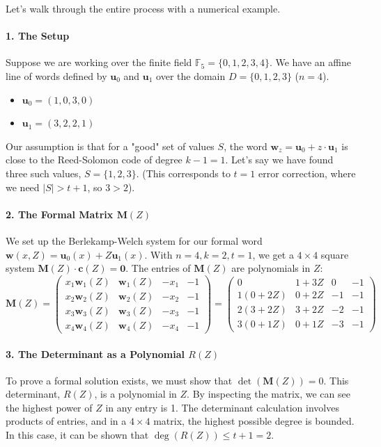 \documentclass{article}
\begin{document}
\begin{tcolorbox}[breakable, title={Full Example: Proving a Formal Solution Exists}]
Let's walk through the entire process with a numerical example.

\paragraph{1. The Setup}
Suppose we are working over the finite field $\mathbb{F}_5 = \{0,1,2,3,4\}$. We have an affine line of words defined by $\mathbf{u}_0$ and $\mathbf{u}_1$ over the domain $D=\{0,1,2,3\}$ ($n=4$).
\begin{itemize}
    \item $\mathbf{u}_0 = (1, 0, 3, 0)$
    \item $\mathbf{u}_1 = (3, 2, 2, 1)$
\end{itemize}
Our assumption is that for a "good" set of values $S$, the word $\mathbf{w}_z = \mathbf{u}_0 + z \cdot \mathbf{u}_1$ is close to the Reed-Solomon code of degree $k-1=1$. Let's say we have found three such values, $S=\{1,2,3\}$. (This corresponds to $t=1$ error correction, where we need $|S| > t+1$, so $3 > 2$).

\paragraph{2. The Formal Matrix $\mathbf{M}(Z)$}
We set up the Berlekamp-Welch system for our formal word $\mathbf{w}(x,Z) = \mathbf{u}_0(x) + Z\mathbf{u}_1(x)$. With $n=4, k=2, t=1$, we get a $4 \times 4$ square system $\mathbf{M}(Z)\cdot\mathbf{c}(Z) = \mathbf{0}$. The entries of $\mathbf{M}(Z)$ are polynomials in $Z$:
\[
\mathbf{M}(Z) = 
\begin{pmatrix}
x_1 \mathbf{w}_1(Z) & \mathbf{w}_1(Z) & -x_1 & -1 \\
x_2 \mathbf{w}_2(Z) & \mathbf{w}_2(Z) & -x_2 & -1 \\
x_3 \mathbf{w}_3(Z) & \mathbf{w}_3(Z) & -x_3 & -1 \\
x_4 \mathbf{w}_4(Z) & \mathbf{w}_4(Z) & -x_4 & -1
\end{pmatrix}
=
\begin{pmatrix}
0 & 1+3Z & 0 & -1 \\
1(0+2Z) & 0+2Z & -1 & -1 \\
2(3+2Z) & 3+2Z & -2 & -1 \\
3(0+1Z) & 0+1Z & -3 & -1
\end{pmatrix}
\]

\paragraph{3. The Determinant as a Polynomial $R(Z)$}
To prove a formal solution exists, we must show that $\det(\mathbf{M}(Z)) = 0$. This determinant, $R(Z)$, is a polynomial in $Z$. By inspecting the matrix, we can see the highest power of $Z$ in any entry is 1. The determinant calculation involves products of entries, and in a $4 \times 4$ matrix, the highest possible degree is bounded. In this case, it can be shown that $\deg(R(Z)) \le t+1 = 2$.


\end{tcolorbox}
\end{document}
